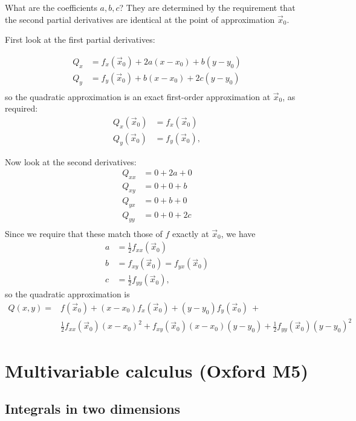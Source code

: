 What are the coefficients $a,b,c$? They are determined by the requirement that
the second partial derivatives are identical at the point of approximation
$\vec x_0$.

First look at the first partial derivatives:

\begin{align*}
  Q_x &= f_x(\vec x_0) + 2a(x - x_0) + b(y - y_0)\\
  Q_y &= f_y(\vec x_0) + b(x - x_0) + 2c(y - y_0)\\
\end{align*}
so the quadratic approximation is an exact first-order approximation at $\vec x_0$, as required:
\begin{align*}
  Q_x(\vec x_0) &= f_x(\vec x_0) \\
  Q_y(\vec x_0) &= f_y(\vec x_0),
\end{align*}

Now look at the second derivatives:
\begin{align*}
  Q_{xx} &= 0 + 2a + 0 \\
  Q_{xy} &= 0 + 0 + b \\
  Q_{yx} &= 0 + b + 0 \\
  Q_{yy} &= 0 + 0 + 2c \\
\end{align*}
Since we require that these match those of $f$ exactly at $\vec x_0$, we have
\begin{align*}
  a &= \frac{1}{2} f_{xx}(\vec x_0) \\
  b &= f_{xy}(\vec x_0) = f_{yx}(\vec x_0) \\
  c &= \frac{1}{2} f_{yy}(\vec x_0),
\end{align*}
so the quadratic approximation is
\begin{align*}
Q(x, y) =
&f(\vec x_0) + (x - x_0)f_x(\vec x_0) +
(y - y_0)f_y(\vec x_0) ~+ \\
&\frac{1}{2} f_{xx}(\vec x_0)(x - x_0)^2 +
f_{xy}(\vec x_0)(x - x_0)(y - y_0) +
\frac{1}{2} f_{yy}(\vec x_0)(y - y_0)^2
\end{align*}

\section{Multivariable calculus (Oxford M5)}

\subsection{Integrals in two dimensions}

